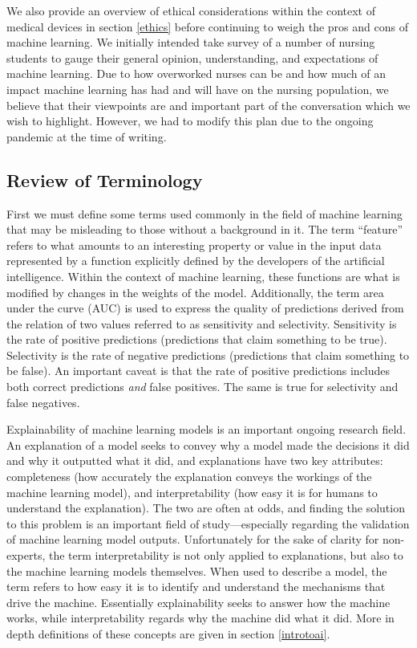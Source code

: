 \documentclass[]{article}
\begin{document}
		We also provide an overview of ethical considerations within the context of medical devices in section \ref{ethics} before continuing to weigh the pros and cons of machine learning. We initially intended take survey of a number of nursing students to gauge their general opinion, understanding, and expectations of machine learning. Due to how overworked nurses can be\cite{doi:10.1111/j.1365-2648.2009.05082.x} and how much of an impact machine learning has had and will have on the nursing population\cite{Ham2017}, we believe that their viewpoints are and important part of the conversation which we wish to highlight. However, we had to modify this plan due to the ongoing pandemic at the time of writing.

		\subsection{Review of Terminology}
			First we must define some terms used commonly in the field of machine learning that may be misleading to those without a background in it. The term ``feature'' refers to what amounts to an interesting property or value in the input data represented by a function explicitly defined by the developers of the artificial intelligence. Within the context of machine learning, these functions are what is modified by changes in the weights of the model. Additionally, the term area under the curve (AUC) is used to express the quality of predictions derived from the relation of two values referred to as sensitivity and selectivity. Sensitivity is the rate of positive predictions (predictions that claim something to be true). Selectivity is the rate of negative predictions (predictions that claim something to be false). An important caveat is that the rate of positive predictions includes both correct predictions \emph{and} false positives. The same is true for selectivity and false negatives.\cite{introtoauc,econ2020sense}

			Explainability of machine learning models is an important ongoing research field. An explanation of a model seeks to convey why a model made the decisions it did and why it outputted what it did, and explanations have two key attributes: completeness (how accurately the explanation conveys the workings of the machine learning model), and interpretability (how easy it is for humans to understand the explanation). The two are often at odds, and finding the solution to this problem is an important field of study\cite{8631448}---especially regarding the validation of machine learning model outputs.\cite{10.1145/3328519.3329126} Unfortunately for the sake of clarity for non-experts, the term interpretability is not only applied to explanations, but also to the machine learning models themselves. When used to describe a model, the term refers to how easy it is to identify and understand the mechanisms that drive the machine. Essentially explainability seeks to answer how the machine works, while interpretability regards why the machine did what it did.\cite{8631448} More in depth definitions of these concepts are given in section \ref{introtoai}.
\end{document}
